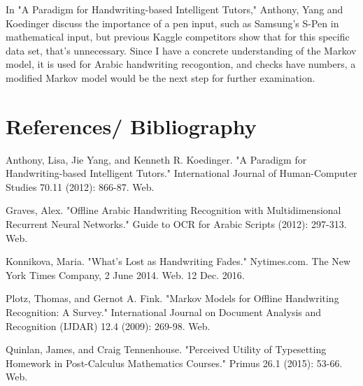 \documentclass[a4paper]{article}
\begin{document}
\begin{doublespace}
In "A Paradigm for Handwriting-based Intelligent Tutors," Anthony, Yang and Koedinger discuss the importance of a pen input, such as Samsung's S-Pen in mathematical input, but previous Kaggle competitors show that for this specific data set, that's unnecessary. Since I have a concrete understanding of the Markov model, it is used for Arabic handwriting recogontion, and checks have numbers, a modified Markov model would be the next step for further examination. 

\newpage

\section{References/ Bibliography}
\begin{hangparas}{.25in}{1}
Anthony, Lisa, Jie Yang, and Kenneth R. Koedinger. "A Paradigm for Handwriting-based Intelligent Tutors." International Journal of Human-Computer Studies 70.11 (2012): 866-87. Web.

Graves, Alex. "Offline Arabic Handwriting Recognition with Multidimensional Recurrent Neural Networks." Guide to OCR for Arabic Scripts (2012): 297-313. Web.

Konnikova, Maria. "What's Lost as Handwriting Fades." Nytimes.com. The New York Times Company, 2 June 2014. Web. 12 Dec. 2016.

Plotz, Thomas, and Gernot A. Fink. "Markov Models for Offline Handwriting Recognition: A Survey." International Journal on Document Analysis and Recognition (IJDAR) 12.4 (2009): 269-98. Web.

Quinlan, James, and Craig Tennenhouse. "Perceived Utility of Typesetting Homework in Post-Calculus Mathematics Courses." Primus 26.1 (2015): 53-66. Web.
\end{hangparas}
\end{doublespace}
\end{document}

